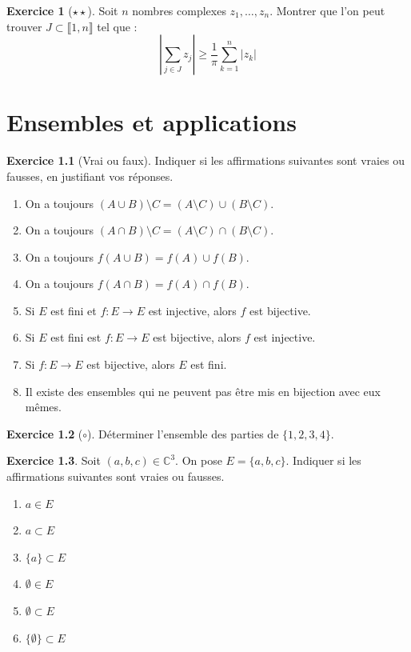 \documentclass[french]{book}
\newcommand{\C}{\mathbb{C}}
\theoremstyle{definition}
\newtheorem{ex}{Exercice}[chapter]
\theoremstyle{theorem}
\theoremstyle{remark}
\begin{document}
\begin{ex}[$\star\star$]
	Soit $n$ nombres complexes $z_1,\ldots,z_n$. Montrer que l'on peut trouver $J\subset\llbracket1,n\rrbracket$ tel que : $$\left\lvert\sum_{j\in J}z_j\right\rvert\geqslant\frac{1}{\pi}\sum_{k=1}^{n}\lvert z_k\rvert$$
\end{ex}


\chapter{Ensembles et applications}

\begin{ex}[Vrai ou faux]
	Indiquer si les affirmations suivantes sont vraies ou fausses, en justifiant vos réponses.
	\begin{enumerate}
		\item On a toujours $(A\cup B)\setminus C=(A\setminus C)\cup (B\setminus C)$.
		\item On a toujours $(A\cap B)\setminus C=(A\setminus C)\cap(B\setminus C)$.
		\item On a toujours $f(A\cup B)=f(A)\cup f(B)$.
		\item On a toujours $f(A\cap B)=f(A)\cap f(B)$.
		\item Si $E$ est fini et $f:E\to E$ est injective, alors $f$ est bijective.
		\item Si $E$ est fini est $f:E\to E$ est bijective, alors $f$ est injective.
		\item Si $f:E\to E$ est bijective, alors $E$ est fini.
		\item Il existe des ensembles qui ne peuvent pas être mis en bijection avec eux mêmes.
	\end{enumerate}
\end{ex}

\begin{ex}[$\circ$]
	Déterminer l'ensemble des parties de $\{1,2,3,4\}$.
\end{ex}

\begin{ex}
	Soit $(a,b,c)\in\C^3$. On pose $E=\{a,b,c\}$. Indiquer si les affirmations suivantes sont vraies ou fausses.
	\begin{enumerate}
		\item $a\in E$
		\item $a\subset E$
		\item $\{a\}\subset E$
		\item $\emptyset\in E$
		\item $\emptyset\subset E$
		\item $\{\emptyset\}\subset E$
	\end{enumerate}
\end{ex}
\end{document}
